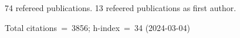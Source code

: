 74 refereed publications. 13 refeered publications as first author.

Total citations~=~3856; h-index~=~34 (2024-03-04)